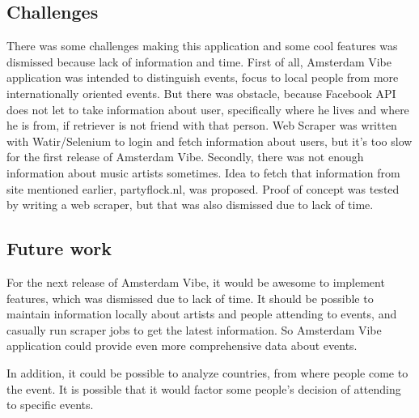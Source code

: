 \documentclass[12pt, a4paper, lithuanian]{article}
\begin{document}
\subsection{Challenges}

  There was some challenges making this application and some cool features was dismissed because lack of information and time. First of all, Amsterdam Vibe application was intended to distinguish events, focus to local people from more internationally oriented events. But there was obstacle, because Facebook API does not let to take information about user, specifically where he lives and where he is from, if retriever is not friend with that person. Web Scraper was written with Watir/Selenium to login and fetch information about users, but it's too slow for the first release of Amsterdam Vibe.
  Secondly, there was not enough information about music artists sometimes. Idea to fetch that information from site mentioned earlier, partyflock.nl, was proposed. Proof of concept was tested by writing a web scraper, but that was also dismissed due to lack of time.

\subsection{Future work}

  For the next release of Amsterdam Vibe, it would be awesome to implement features, which was dismissed due to lack of time. It should be possible to maintain information locally about artists and people attending to events, and casually run scraper jobs to get the latest information. So Amsterdam Vibe application could provide even more comprehensive data about events.

  In addition, it could be possible to analyze countries, from where people come to the event. It is possible that it would factor some people's decision of attending to specific events.
\end{document}
